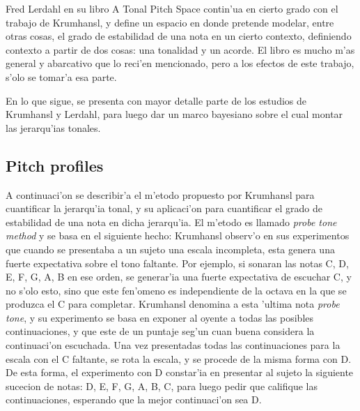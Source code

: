 
Fred Lerdahl \citep{Lerdahl2001} en su libro A Tonal Pitch Space contin'ua en cierto grado con el trabajo de Krumhansl, y define un espacio en donde pretende 
modelar, entre otras cosas, el grado de estabilidad de una nota en un cierto contexto, definiendo contexto a partir de dos cosas: una tonalidad y un acorde. 
El libro es mucho m'as general y abarcativo que lo reci'en mencionado, pero a los efectos de este trabajo, s'olo se tomar'a esa parte.

En lo que sigue, se presenta con mayor detalle parte de los estudios de Krumhansl y Lerdahl, para luego dar un marco bayesiano sobre el cual montar las jerarqu'ias tonales.

\subsection{Pitch profiles}
A continuaci'on se describir'a el m'etodo propuesto por Krumhansl para cuantificar la jerarqu'ia tonal, y su aplicaci'on para cuantificar el grado de estabilidad 
de una nota en dicha jerarqu'ia. 
El m'etodo es llamado \emph{probe tone method} y se basa en el siguiente hecho: Krumhansl observ'o en sus experimentos que cuando se presentaba a un sujeto una escala 
incompleta, esta genera una fuerte expectativa sobre el tono faltante. Por ejemplo, si sonaran las notas C, D, E, F, G, A, B en ese orden, se generar'ia una fuerte 
expectativa de escuchar C, y no s'olo esto, sino que este fen'omeno es independiente de la octava en la que se produzca el C para completar.
Krumhansl denomina a esta 'ultima nota \emph{probe tone}, y su experimento se basa en exponer al oyente a todas las posibles continuaciones, y que este de un puntaje
seg'un cuan buena considera la continuaci'on escuchada. Una vez presentadas todas las continuaciones para la escala con el C faltante, se rota la escala, y se procede
de la misma forma con D. De esta forma, el experimento con D constar'ia en presentar al sujeto la siguiente sucecion de notas: D, E, F, G, A, B, C, para luego pedir
que califique las continuaciones, esperando que la mejor continuaci'on sea D.

